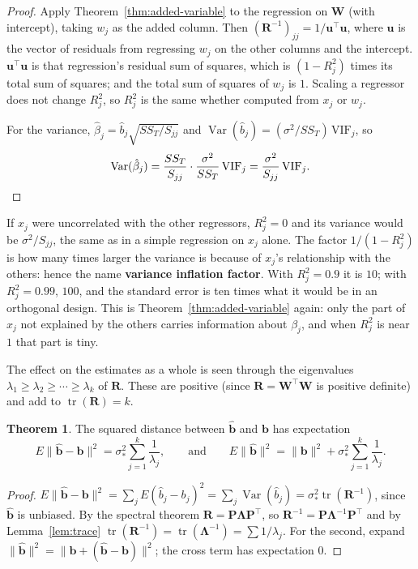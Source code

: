 \documentclass[11pt,a4paper]{article}
\numberwithin{equation}{section}
\theoremstyle{definition}
\newtheorem{thm}{Theorem}[subsection]
\begin{document}
\begin{proof}
Apply Theorem~\ref{thm:added-variable} to the regression on $\mathbf{W}$ (with intercept), taking
$w_j$ as the added column. Then $(\mathbf{R}^{-1})_{jj} = 1/\mathbf{u}^\top\mathbf{u}$, where $\mathbf{u}$ is the vector of
residuals from regressing $w_j$ on the other columns and the intercept. $\mathbf{u}^\top\mathbf{u}$ is that
regression's residual sum of squares, which is $(1 - R_j^2)$ times its total sum of squares; and the
total sum of squares of $w_j$ is $1$. Scaling a regressor does not change $R_j^2$, so $R_j^2$ is the
same whether computed from $x_j$ or $w_j$.

For the variance, $\hat\beta_j = \hat b_j\sqrt{SS_T/S_{jj}}$ and
$\operatorname{Var}(\hat b_j) = (\sigma^2/SS_T)\,\mathrm{VIF}_j$, so
\[
\operatorname{Var}(\hat\beta_j) = \frac{SS_T}{S_{jj}}\cdot\frac{\sigma^2}{SS_T}\,\mathrm{VIF}_j = \frac{\sigma^2}{S_{jj}}\,\mathrm{VIF}_j . \qedhere
\]
\end{proof}

If $x_j$ were uncorrelated with the other regressors, $R_j^2 = 0$ and its variance would be
$\sigma^2/S_{jj}$, the same as in a simple regression on $x_j$ alone. The factor $1/(1 - R_j^2)$ is how
many times larger the variance is because of $x_j$'s relationship with the others: hence the name
\textbf{variance inflation factor}. With $R_j^2 = 0.9$ it is $10$; with $R_j^2 = 0.99$, $100$, and the
standard error is ten times what it would be in an orthogonal design. This is
Theorem~\ref{thm:added-variable} again: only the part of $x_j$ not explained by the others carries
information about $\beta_j$, and when $R_j^2$ is near $1$ that part is tiny.

The effect on the estimates as a whole is seen through the eigenvalues
$\lambda_1 \ge \lambda_2 \ge \cdots \ge \lambda_k$ of $\mathbf{R}$. These are positive (since $\mathbf{R} = \mathbf{W}^\top\mathbf{W}$ is
positive definite) and add to $\operatorname{tr}(\mathbf{R}) = k$.

\begin{thm}\label{thm:length}
The squared distance between $\hat{\mathbf{b}}$ and $\mathbf{b}$ has expectation
\[
E\|\hat{\mathbf{b}} - \mathbf{b}\|^2 = \sigma_*^2\sum_{j=1}^k\frac{1}{\lambda_j} ,
\qquad\text{and}\qquad
E\|\hat{\mathbf{b}}\|^2 = \|\mathbf{b}\|^2 + \sigma_*^2\sum_{j=1}^k\frac{1}{\lambda_j} .
\]
\end{thm}

\begin{proof}
$E\|\hat{\mathbf{b}} - \mathbf{b}\|^2 = \sum_j E(\hat b_j - b_j)^2 = \sum_j\operatorname{Var}(\hat b_j) = \sigma_*^2\operatorname{tr}(\mathbf{R}^{-1})$,
since $\hat{\mathbf{b}}$ is unbiased. By the spectral theorem $\mathbf{R} = \mathbf{P}\boldsymbol\Lambda\mathbf{P}^\top$, so
$\mathbf{R}^{-1} = \mathbf{P}\boldsymbol\Lambda^{-1}\mathbf{P}^\top$ and by Lemma~\ref{lem:trace}
$\operatorname{tr}(\mathbf{R}^{-1}) = \operatorname{tr}(\boldsymbol\Lambda^{-1}) = \sum 1/\lambda_j$. For the second, expand
$\|\hat{\mathbf{b}}\|^2 = \|\mathbf{b} + (\hat{\mathbf{b}} - \mathbf{b})\|^2$; the cross term has expectation $0$.
\end{proof}
\end{document}
